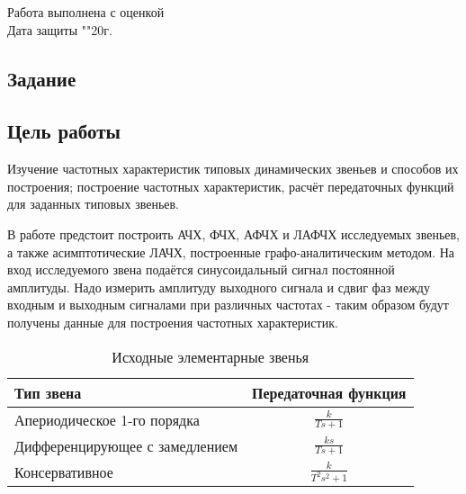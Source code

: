 \documentclass[a4paper, 12pt]{article}
\begin{document}
\begin{titlepage}
		Работа выполнена с оценкой \hspace{1cm} \underline{\hspace{8cm}} \\ 
		\vspace{1cm}
		Дата защиты "\underline{\hspace{0.7cm}}"\hspace{0.2cm}\underline{\hspace{2cm}}\hspace{0.2cm}20\underline{\hspace{0.7cm}}г.

\end{titlepage}

\begin{center}
\section*{Задание}
\end{center}

\subsection*{Цель работы} 
\par
Изучение частотных характеристик типовых динамических звеньев и способов их построения; построение частотных характеристик, расчёт передаточных функций для заданных типовых звеньев.
\par
В работе предстоит построить АЧХ, ФЧХ, АФЧХ и ЛАФЧХ исследуемых звеньев, а также асимптотические ЛАЧХ, построенные графо-аналитическим методом. На вход исследуемого звена подаётся синусоидальный сигнал постоянной амплитуды. Надо измерить амплитуду выходного сигнала и сдвиг фаз между входным и выходным сигналами при различных частотах - таким образом будут получены данные для построения частотных характеристик. 

\begin{table}[h!]
    \centering
    \begin{threeparttable}
    	\caption{Исходные элементарные звенья}
    	\begin{tabular} {|l|c|}
        \hline
        	Тип звена & Передаточная функция \\ [0.5cm]  \hline
        	Апериодическое 1-го порядка & $\displaystyle\frac{k}{Ts + 1}$ \\ [0.5cm]  \hline
        	Дифференцирующее с замедлением & $\displaystyle\frac{ks}{Ts+1}$ \\ [0.5cm]  \hline
        	Консервативное & $\displaystyle\frac{k}{T^2 s^2+ 1}$ \\ [0.5cm] \hline
    	\end{tabular}
    \end{threeparttable} 
\end{table}
\end{document}
